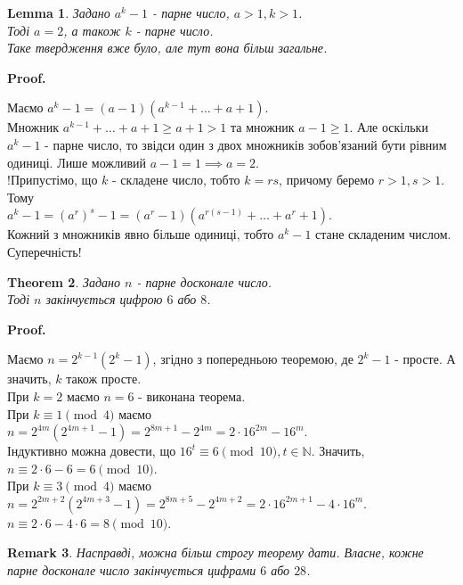 \documentclass[a4paper, 14pt]{extarticle}
\makeatletter
\theoremstyle{theoremdd}
\newtheorem{theorem}{Theorem}[subsection]
\theoremstyle{theoremdd}
\theoremstyle{theoremdd}
\theoremstyle{theoremdd}
\theoremstyle{theoremdd}
\theoremstyle{theoremdd}
\newtheorem{remark}[theorem]{Remark}
\theoremstyle{theoremdd}
\newtheorem{lemma}[theorem]{Lemma}
\theoremstyle{theoremdd}
\def\qed{$\blacksquare$}
\renewenvironment{proof}[1][Proof.\\]{\par
\pushQED{\hfill \qed}%
\normalfont \topsep6\p@\@plus6\p@\relax
\trivlist
\item\relax
{\bfseries
#1\@addpunct{.}}\hspace\labelsep\ignorespaces
}{%
\popQED\endtrivlist\@endpefalse
}
\makeatother
\begin{document}
\begin{lemma}
Задано $a^k-1$ - парне число, $a>1, k>1$.\\
Тоді $a = 2$, а також $k$ - парне число.\\
\textit{Таке твердження вже було, але тут вона більш загальне.}
\end{lemma}

\begin{proof}
Маємо $a^k-1=(a-1)(a^{k-1}+\dots+a+1).$\\
Множник $a^{k-1}+\dots +a+1 \geq a+1>1$ та множник $a-1\geq 1$. Але оскільки $a^k-1$ - парне число, то звідси один з двох множників зобов'язаний бути рівним одиниці. Лише можливий $a-1=1 \implies a =2$.\\
!Припустімо, що $k$ - складене число, тобто $k = rs$, причому беремо $r>1,s>1$. Тому\\
$a^k-1=(a^r)^s-1 = (a^r-1)(a^{r(s-1)}+ \dots + a^r+1)$.\\
Кожний з множників явно більше одиниці, тобто $a^k-1$ стане складеним числом. Суперечність!
\end{proof}

\begin{theorem}
Задано $n$ - парне досконале число.\\
Тоді $n$ закінчується цифрою $6$ або $8$.
\end{theorem}

\begin{proof}
Маємо $n = 2^{k-1}(2^k-1)$, згідно з попередньою теоремою, де $2^k-1$ - просте. А значить, $k$ також просте.\\
При $k = 2$ маємо $n = 6$ - виконана теорема.\\
При $k \equiv 1 \pmod 4$ маємо\\
$n = 2^{4m}(2^{4m+1}-1) = 2^{8m+1} - 2^{4m} = 2 \cdot 16^{2m} - 16^m$.\\
Індуктивно можна довести, що $16^t \equiv 6 \pmod {10}, t \in \mathbb{N}$. Значить, \\
$n \equiv 2 \cdot 6 - 6 = 6 \pmod {10}$.\\
При $k \equiv 3 \pmod 4$ маємо\\
$n = 2^{2m+2}(2^{4m+3}-1) = 2^{8m+5} - 2^{4m+2} = 2 \cdot 16^{2m+1} - 4 \cdot 16^m$.\\
$n \equiv 2 \cdot 6 - 4 \cdot 6 = 8 \pmod {10}$.
\end{proof}

\begin{remark}
Насправді, можна більш строгу теорему дати. Власне, кожне парне досконале число закінчується цифрами $6$ або $28$.
\iffalse
Нам достатньо розглянути випадок $k \equiv 3 \pmod 4$, бо для інших непарних простих там завжди закінчується цифрою $6$.\\
Зауважимо, що $2^{k-1} = 2^{4m+2} = 16^m \cdot 4 \equiv 6 \cdot 4 = 4 \pmod {10}$.\\
Для чисел $k > 2$ ми маємо $4 \mid 2^{k-1}$. За ознакою подільності, останні дві цифри $2^{k-1}$ діляться на $4$.
\fi
\end{remark}
\end{document}
